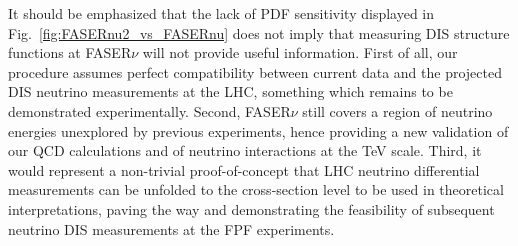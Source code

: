 It should be emphasized that the lack of PDF sensitivity displayed in Fig.~\ref{fig:FASERnu2_vs_FASERnu}
does not imply that measuring DIS structure functions at FASER$\nu$ will not provide useful information.
%
First of all, our procedure assumes perfect compatibility between current data and the projected DIS
neutrino measurements at the LHC, something which remains to be demonstrated experimentally.
%
Second, FASER$\nu$ still covers a region of neutrino energies unexplored by previous experiments, hence providing
a new validation of our QCD calculations and of neutrino interactions at the TeV scale.
%
Third, it would represent a non-trivial proof-of-concept that LHC neutrino differential measurements can be
unfolded to the cross-section level to be used in  theoretical
interpretations, paving the way and demonstrating the feasibility of subsequent neutrino DIS
measurements at the FPF experiments.
